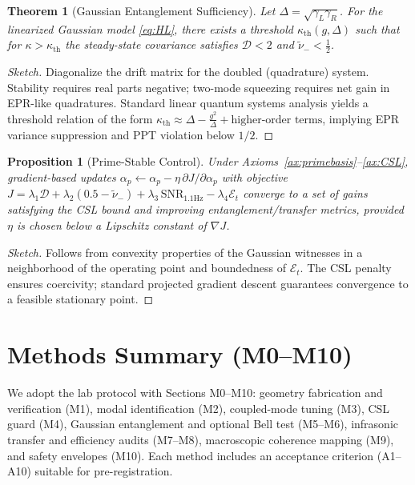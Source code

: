 \documentclass[11pt]{article}
\newtheorem{theorem}{Theorem}
\newtheorem{proposition}{Proposition}
\begin{document}
\begin{theorem}[Gaussian Entanglement Sufficiency]
\label{thm:ent}
Let \(\Delta=\sqrt{\gamma_L\gamma_R}\). For the linearized Gaussian model \eqref{eq:HL}, there exists a threshold \(\kappa_{\mathrm{th}}(g,\Delta)\) such that for \(\kappa>\kappa_{\mathrm{th}}\) the steady-state covariance satisfies \(\mathcal D<2\) and \(\tilde\nu_-<\frac12\).
\end{theorem}
\begin{proof}[Sketch]
Diagonalize the drift matrix for the doubled (quadrature) system. Stability requires real parts negative; two-mode squeezing requires net gain in EPR-like quadratures. Standard linear quantum systems analysis yields a threshold relation of the form
\(\kappa_{\mathrm{th}}\approx \Delta - \frac{g^2}{\Delta} + \text{higher-order terms}\),
implying EPR variance suppression and PPT violation below \(1/2\).
\end{proof}

\begin{proposition}[Prime-Stable Control]
\label{prop:prime}
Under Axioms~\ref{ax:primebasis}--\ref{ax:CSL}, gradient-based updates
\(\alpha_p\leftarrow \alpha_p-\eta\,\partial J/\partial \alpha_p\) with objective
\(J=\lambda_1\mathcal D + \lambda_2(0.5-\tilde\nu_-) + \lambda_3\,\mathrm{SNR}_{1.1\mathrm{Hz}} - \lambda_4\mathcal E_t\)
converge to a set of gains satisfying the CSL bound and improving entanglement/transfer metrics, provided \(\eta\) is chosen below a Lipschitz constant of \(\nabla J\).
\end{proposition}
\begin{proof}[Sketch]
Follows from convexity properties of the Gaussian witnesses in a neighborhood of the operating point and boundedness of \(\mathcal E_t\). The CSL penalty ensures coercivity; standard projected gradient descent guarantees convergence to a feasible stationary point.
\end{proof}

\section{Methods Summary (M0--M10)}
We adopt the lab protocol with Sections M0--M10: geometry fabrication and verification (M1), modal identification (M2), coupled-mode tuning (M3), CSL guard (M4), Gaussian entanglement and optional Bell test (M5--M6), infrasonic transfer and efficiency audits (M7--M8), macroscopic coherence mapping (M9), and safety envelopes (M10). Each method includes an acceptance criterion (A1--A10) suitable for pre-registration.
\end{document}
